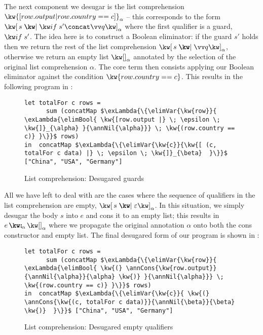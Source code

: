 \noindent
The next component we desugar is the list comprehension $\kw{[ row.output | row.country == c ]}_{\alpha}$ -- this corresponds to the form $\annListComp{s}{\qualGuard{s'} \concat \vec{q}}{\alpha}$ where the first qualifier is a guard, $\qualGuard{s'}$. The idea here is to construct a Boolean eliminator: if the guard $s'$ holds then we return the rest of the list comprehension $\annListComp{s}{\vec{q}}{\alpha}$, otherwise we return an empty list $\annNil{\alpha}$ annotated by the selection of the original list comprehension $\alpha$. The core term then consists applying our Boolean eliminator against the condition $\kw{row.country == c}$. This results in the following program in :

\begin{figure}[H]
   \small
\begin{lstlisting}
let totalFor c rows =
      sum (concatMap $\exLambda{\{\elimVar{\kw{row}}{  \exLambda{\elimBool{ \kw{[row.output |} \; \epsilon \; \kw{]}_{\alpha} }{\annNil{\alpha}}} \; \kw{(row.country == c)} }\}}$ rows)
in  concatMap $\exLambda{\{\elimVar{\kw{c}}{\kw{[ (c, totalFor c data) |} \; \epsilon \; \kw{]}_{\beta}  }\}}$ ["China", "USA", "Germany"]
\end{lstlisting}
   \caption{List comprehension: Desugared guards}
   \label{fig:surface-language:example-3}
\end{figure}

\noindent
All we have left to deal with are the cases where the sequence of qualifiers in the list comprehension are empty, $\annListComp{s}{\seqEmpty}{\alpha}$. In this situation, we simply desugar the body $s$ into $e$ and cons it to an empty list; this results in $\annCons{e}{\annNil{\alpha}}{\alpha}$ where we propagate the original annotation $\alpha$ onto both the cons constructor and empty list. The final desugared form of our program is shown in :

\begin{figure}[H]
\small
\begin{lstlisting}
let totalFor c rows =
      sum (concatMap $\exLambda{\{\elimVar{\kw{row}}{  \exLambda{\elimBool{ \kw{(} \annCons{\kw{row.output}}{\annNil{\alpha}}{\alpha} \kw{)} }{\annNil{\alpha}}} \; \kw{(row.country == c)} }\}}$ rows)
in  concatMap $\exLambda{\{\elimVar{\kw{c}}{ \kw{(} \annCons{\kw{(c, totalFor c data)}}{\annNil{\beta}}{\beta} \kw{)}  }\}}$ ["China", "USA", "Germany"]
\end{lstlisting}
\caption{List comprehension: Desugared empty qualifiers}
\label{fig:surface-language:example-4}
\end{figure}

